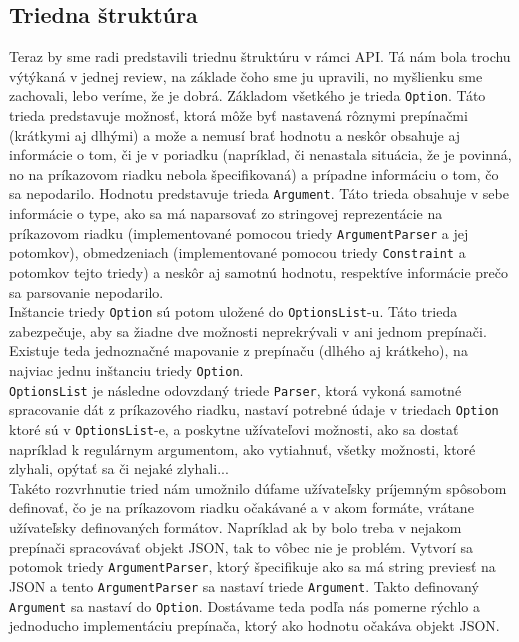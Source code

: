 \documentclass{article}
\begin{document}
\subsection{Triedna štruktúra}
Teraz by sme radi predstavili triednu štruktúru v rámci API. Tá nám bola trochu výtýkaná v jednej review, na základe čoho sme ju upravili, no myšlienku sme zachovali, lebo veríme, že je dobrá. Základom všetkého je trieda \texttt{Option}. Táto trieda predstavuje možnosť, ktorá môže byť nastavená rôznymi prepínačmi (krátkymi aj dlhými) a može a nemusí brať hodnotu a neskôr obsahuje aj informácie o tom, či je v poriadku (napríklad, či nenastala situácia, že je povinná, no na príkazovom riadku nebola špecifikovaná) a prípadne informáciu o tom, čo sa nepodarilo. Hodnotu predstavuje trieda \texttt{Argument}. Táto trieda obsahuje v sebe informácie o type, ako sa má naparsovať zo stringovej reprezentácie na príkazovom riadku (implementované pomocou triedy \texttt{ArgumentParser} a jej potomkov), obmedzeniach (implementované pomocou triedy \texttt{Constraint} a potomkov tejto triedy) a neskôr aj samotnú hodnotu, respektíve informácie prečo sa parsovanie nepodarilo.\\
Inštancie triedy \texttt{Option} sú potom uložené do \texttt{OptionsList}-u. Táto trieda zabezpečuje, aby sa žiadne dve možnosti neprekrývali v ani jednom prepínači. Existuje teda jednoznačné mapovanie z prepínaču (dlhého aj krátkeho), na najviac jednu inštanciu triedy \texttt{Option}.\\
\texttt{OptionsList} je následne odovzdaný triede \texttt{Parser}, ktorá vykoná samotné spracovanie dát z príkazového riadku, nastaví potrebné údaje v triedach \texttt{Option} ktoré sú v \texttt{OptionsList}-e, a poskytne užívateľovi možnosti, ako sa dostať napríklad k regulárnym argumentom, ako vytiahnuť, všetky možnosti, ktoré zlyhali, opýtať sa či nejaké zlyhali...\\
Takéto rozvrhnutie tried nám umožnilo dúfame užívateľsky príjemným spôsobom definovať, čo je na príkazovom riadku očakávané a v akom formáte, vrátane užívateľsky definovaných formátov. Napríklad ak by bolo treba v nejakom prepínači spracovávať objekt JSON, tak to vôbec nie je problém. Vytvorí sa potomok triedy \texttt{ArgumentParser}, ktorý špecifikuje ako sa má string previesť na JSON a tento \texttt{ArgumentParser} sa nastaví triede \texttt{Argument}. Takto definovaný \texttt{Argument} sa nastaví do \texttt{Option}. Dostávame teda podľa nás pomerne rýchlo a jednoducho implementáciu prepínača, ktorý ako hodnotu očakáva objekt JSON.
\end{document}

